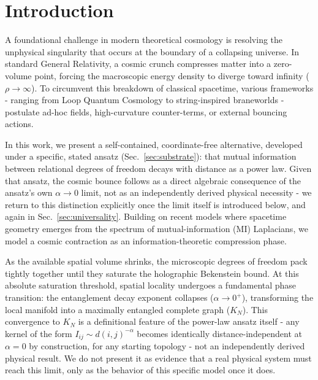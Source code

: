 \documentclass[onecolumn,PRD,amsmath,amssymb,aps,nofootinbib,superscriptaddress,11pt]{revtex4-2}
\begin{document}
\maketitle


\section{Introduction}
A foundational challenge in modern theoretical cosmology is resolving the unphysical singularity that occurs at the boundary of a collapsing universe. In standard General Relativity, a cosmic crunch compresses matter into a zero-volume point, forcing the macroscopic energy density to diverge toward infinity ($\rho \to \infty$). To circumvent this breakdown of classical spacetime, various frameworks - ranging from Loop Quantum Cosmology to string-inspired braneworlds - postulate ad-hoc fields, high-curvature counter-terms, or external bouncing actions.

In this work, we present a self-contained, coordinate-free alternative, developed under a specific, stated ansatz (Sec.~\ref{sec:substrate}): that mutual information between relational degrees of freedom decays with distance as a power law. Given that ansatz, the cosmic bounce follows as a direct algebraic consequence of the ansatz's own $\alpha \to 0$ limit, not as an independently derived physical necessity - we return to this distinction explicitly once the limit itself is introduced below, and again in Sec.~\ref{sec:universality}. Building on recent models where spacetime geometry emerges from the spectrum of mutual-information (MI) Laplacians, we model a cosmic contraction as an information-theoretic compression phase.

As the available spatial volume shrinks, the microscopic degrees of freedom pack tightly together until they saturate the holographic Bekenstein bound. At this absolute saturation threshold, spatial locality undergoes a fundamental phase transition: the entanglement decay exponent collapses ($\alpha \to 0^+$), transforming the local manifold into a maximally entangled complete graph ($K_N$). This convergence to $K_N$ is a definitional feature of the power-law ansatz itself - any kernel of the form $I_{ij} \sim d(i,j)^{-\alpha}$ becomes identically distance-independent at $\alpha = 0$ by construction, for any starting topology - not an independently derived physical result. We do not present it as evidence that a real physical system must reach this limit, only as the behavior of this specific model once it does.
\end{document}
